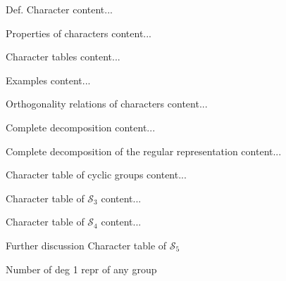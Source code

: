 \documentclass[handout, 10pt]{beamer}
\newcommand{\Sym}{\mathcal{S}}
\begin{document}
	\begin{frame}{Def. Character}
		content...
	\end{frame}
	
	\begin{frame}{Properties of characters}
		content...
	\end{frame}
	
	\begin{frame}{Character tables}
		content...
	\end{frame}
	
	\begin{frame}{Examples}
		content...
	\end{frame}
	
	\begin{frame}{Orthogonality relations of characters}
		content...
	\end{frame}
	
	\begin{frame}{Complete decomposition}
		content...
	\end{frame}
	
	\begin{frame}{Complete decomposition of the regular representation}
		content...
	\end{frame}
	
	\begin{frame}{Character table of cyclic groups}
		content...
	\end{frame}
	
	\begin{frame}{Character table of $\Sym_3$}
		content...
	\end{frame}
	
	\begin{frame}{Character table of $\Sym_4$}
		content...
	\end{frame}
	
	\begin{frame}{Further discussion}
		Character table of $\Sym_5$
		
		Number of deg 1 repr of any group
	\end{frame}
	
\end{document}
